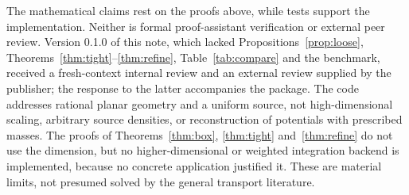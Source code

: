 \documentclass[11pt]{article}
\theoremstyle{remark}
\begin{document}
The mathematical claims rest on the proofs above, while tests support the
implementation. Neither is formal proof-assistant verification or external
peer review. Version 0.1.0 of this note, which lacked
Propositions~\ref{prop:loose}, Theorems~\ref{thm:tight}--\ref{thm:refine},
Table~\ref{tab:compare} and the benchmark, received a fresh-context internal
review and an external review supplied by the publisher; the response to the
latter accompanies the package. The code addresses rational planar geometry
and a uniform source, not high-dimensional scaling, arbitrary source
densities, or reconstruction of potentials with prescribed masses. The proofs
of Theorems~\ref{thm:box}, \ref{thm:tight} and~\ref{thm:refine} do not use the
dimension, but no higher-dimensional or weighted integration backend is
implemented, because no concrete application justified it. These are material
limits, not presumed solved by the general transport literature.
\end{document}
